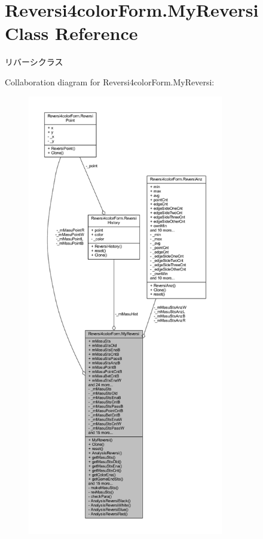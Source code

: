 \hypertarget{class_reversi4color_form_1_1_my_reversi}{}\section{Reversi4color\+Form.\+My\+Reversi Class Reference}
\label{class_reversi4color_form_1_1_my_reversi}


リバーシクラス  




Collaboration diagram for Reversi4color\+Form.\+My\+Reversi\+:\nopagebreak
\begin{figure}[H]
\begin{center}
\leavevmode
\includegraphics[height=550pt]{class_reversi4color_form_1_1_my_reversi__coll__graph}
\end{center}
\end{figure}
